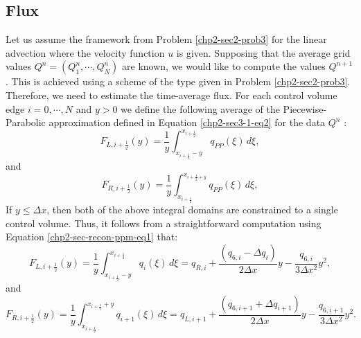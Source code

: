 \subsection{Flux}
\label{chp2-sec-flux}
Let us assume the framework from Problem \ref{chp2-sec2-prob3} for the linear advection
where the velocity function $u$ is given.
Supposing that the average grid values $Q^{n} = (Q^{n}_1, \cdots, Q^{n}_N)$ are known,
we would like to compute the values $Q^{n+1}$.
This is achieved using a scheme of the type given in Problem \ref{chp2-sec2-prob3}.
Therefore, we need to estimate the time-average flux.
For each control volume edge $i=0, \cdots, N$ and $y>0$ 
we define the following average of the Piecewise-Parabolic approximation
defined in Equation \eqref{chp2-sec3-1-eq2} for the data $Q^{n}$ \citep{colella:1984}:
\begin{equation}
	\label{chp-sec-flux:fL_1}
	F_{L,i+\frac{1}{2}}(y) = \frac{1}{y} \int_{x_{i+\frac{1}{2}}-y}^{x_{i+\frac{1}{2}}}
	q_{PP}(\xi)\,d\xi,
\end{equation}
and
\begin{equation}
	\label{chp-sec-flux:fR_1}
	F_{R,i+\frac{1}{2}}(y) = \frac{1}{y} \int_{x_{i+\frac{1}{2}}}^{x_{i+\frac{1}{2}+y}}
	q_{PP}(\xi)\,d\xi,
\end{equation}
If $y \leq \Delta x$, then both of the above integral domains
are constrained to a single control volume. Thus,
it follows from a straightforward computation using 
Equation \eqref{chp2-sec-recon-ppm-eq1} that:
\begin{equation}
	\label{chp-sec-flux:fL_2}
	F_{L,i+\frac{1}{2}}(y) = \frac{1}{y} \int_{x_{i+\frac{1}{2}}-y}^{x_{i+\frac{1}{2}}}
	q_{i}(\xi)\,d\xi = 
	q_{R,i} +\frac{(q_{6,i} - \Delta q_i)}{2\Delta x}y
	- \frac{q_{6,i}}{3\Delta x^2}y^2,
\end{equation}
and
\begin{equation}
	\label{chp-sec-flux:fR_2}
	F_{R,i+\frac{1}{2}}(y) = \frac{1}{y} \int_{x_{i+\frac{1}{2}}}^{x_{i+\frac{1}{2}}+y}
	q_{i+1}(\xi)\,d\xi = 
	q_{L,i+1} +\frac{(q_{6,i+1} + \Delta q_{i+1})}{2\Delta x}y
	- \frac{q_{6,i+1}}{3\Delta x^2}y^2.
\end{equation}

